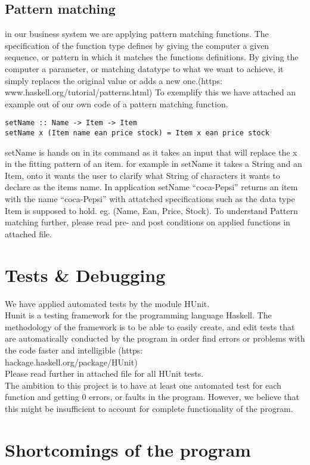 \documentclass[11pt]{article}
\begin{document}
\subsection{Pattern matching}
in our business system we are applying pattern matching functions. The specification of the function type defines by giving the computer a given sequence, or pattern in which it matches the functions definitions. By giving the computer a parameter, or matching datatype to what we want to achieve, it simply replaces the original value or adds a new one.(https:\\www.haskell.org/tutorial/patterns.html)
To exemplify this we have attached an example out of our own code of a pattern matching function.
\begin{lstlisting}
setName :: Name -> Item -> Item
setName x (Item name ean price stock) = Item x ean price stock
\end{lstlisting}
setName is hands on in its command as it takes an input that will replace the x in the fitting pattern of an item. for example in setName it takes a String and an Item, onto it wants the user to clarify what String of characters it wants to declare as the items name.
In application setName “coca-Pepsi” returns an item with the name “coca-Pepsi” with attatched specifications such as the data type Item is supposed to hold. eg. (Name, Ean, Price, Stock). To understand Pattern matching further, please read pre- and post conditions on applied functions in attached file.
\section{Tests \& Debugging}
We have applied automated tests by the module HUnit.\\
Hunit is a testing framework for the programming language Haskell. The methodology of the framework is to be able to easily create, and edit tests that are automatically conducted by the program in order find errors or problems with the code faster and intelligible (https:\\hackage.haskell.org/package/HUnit)
\\
Please read further in attached file for all HUnit tests.
\\
The ambition to this project is to have at least one automated test for each function and getting 0 errors, or faults in the program. However, we believe that this might be insufficient to account for complete functionality of the program.
\section{Shortcomings of the program}
\end{document}
